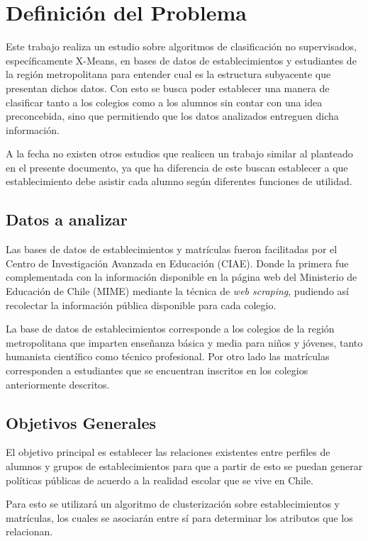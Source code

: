 \chapter{Definici\'on del Problema}

Este trabajo realiza un estudio sobre algoritmos de clasificación no supervisados, específicamente X-Means, en bases de datos de establecimientos y estudiantes de la región metropolitana para entender cual es la estructura subyacente que presentan dichos datos. Con esto se busca poder establecer una manera de clasificar tanto a los colegios como a los alumnos sin contar con una idea preconcebida, sino que permitiendo que los datos analizados entreguen dicha información.

A la fecha no existen otros estudios que realicen un trabajo similar al planteado en el presente documento, ya que ha diferencia de este buscan establecer a que establecimiento debe asistir cada alumno según diferentes funciones de utilidad.


\section{Datos a analizar}

Las bases de datos de establecimientos y matrículas fueron facilitadas por el Centro de Investigación Avanzada en Educación (CIAE). Donde la primera fue complementada con la información disponible en la página web del Ministerio de Educación de Chile (MIME\cite{MIME}) mediante la técnica de \textit{web scraping}, pudiendo así recolectar la información pública disponible para cada colegio.

La base de datos de establecimientos corresponde a los colegios de la región metropolitana que imparten enseñanza básica y media para niños y jóvenes, tanto humanista científico como técnico profesional. Por otro lado las matrículas corresponden a estudiantes que se encuentran inscritos en los colegios anteriormente descritos. 

\section{Objetivos Generales}

El objetivo principal es establecer las relaciones existentes entre perfiles de alumnos y grupos de establecimientos para que a partir de esto se puedan generar políticas públicas de acuerdo a la realidad escolar que se vive en Chile.

Para esto se utilizará un algoritmo de clusterización sobre establecimientos y matrículas, los cuales se asociarán entre sí para determinar los atributos que los relacionan.

